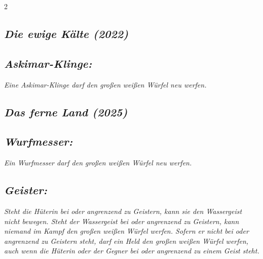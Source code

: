 \documentclass[10pt, a4paper, oneside]{book}
\newcommand{\fan}[1]{\textit{#1}}
\begin{document}
\begin{multicols*}{2}
\begin{bgcolor}[color-dz]
\end{bgcolor}






\begin{bgcolor}
\section{\fan{Die ewige Kälte (2022)}}

\subsection{\fan{Askimar-Klinge:}}

\fan{Eine Askimar-Klinge darf den großen weißen Würfel neu werfen.}

\end{bgcolor}






\begin{bgcolor}
\section{\fan{Das ferne Land (2025)}}

\subsection{\fan{Wurfmesser:}}

\fan{Ein Wurfmesser darf den großen weißen Würfel neu werfen.}


\subsection{\fan{Geister:}}

\fan{Steht die Hüterin bei oder angrenzend zu Geistern, kann sie den Wassergeist nicht bewegen. Steht der Wassergeist bei oder angrenzend zu Geistern, kann niemand im Kampf den großen weißen Würfel werfen. Sofern er nicht bei oder angrenzend zu Geistern steht, darf ein Held den großen weißen Würfel werfen, auch wenn die Hüterin oder der Gegner bei oder angrenzend zu einem Geist steht.}

\end{bgcolor}








\end{multicols*}
\end{document}
